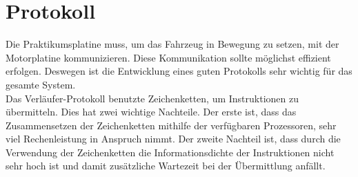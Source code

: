 \chapter{Protokoll\label{chapter_protokoll}}
Die Praktikumsplatine muss, um das Fahrzeug in Bewegung zu setzen, mit
der Motorplatine kommunizieren. Diese Kommunikation sollte möglichst
effizient erfolgen. Deswegen ist die Entwicklung eines guten Protokolls
sehr wichtig für das gesamte System.\\
Das Verläufer-Protokoll benutzte Zeichenketten, um Instruktionen zu übermitteln.
Dies hat zwei wichtige Nachteile. Der erste ist, dass das Zusammensetzen der
Zeichenketten mithilfe der verfügbaren Prozessoren, sehr viel Rechenleistung in
Anspruch nimmt. Der zweite Nachteil ist, dass durch die Verwendung der Zeichenketten
die Informationsdichte der Instruktionen nicht sehr hoch ist und damit zusätzliche
Wartezeit bei der Übermittlung anfällt.

